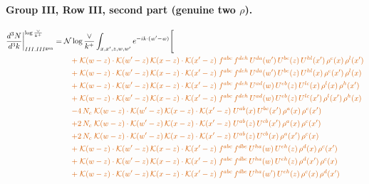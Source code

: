 \documentclass[10pt]{article}
\numberwithin{equation}{section}
\newcommand{\NNv}{\mathcal N\log\frac{\vee}{k^+}}
\begin{document}
\paragraph{Group III, Row III, second part (genuine two $\rho$).}
\begin{align}
\frac{d^3N}{d^3k}\bigg|^{\log\frac{\vee}{k^+}}_{III.III^{\rm gen}}={}&\NNv\int_{x,x',z,w,w'}e^{-ik\cdot(w'-w)}\Bigg[\notag\\
&\quad{\color{BFK}+\;\mathcal{K}(w-z)\cdot\mathcal{K}(w'-z)\,\mathcal{K}(x-z)\cdot\mathcal{K}(x'-z)\;f^{abc}\,f^{deh}\,U^{da}(w')\,U^{be}(z)\,U^{hl}(x')\,\rho^{c}(x)\,\rho^{l}(x')}\notag\\
&\quad{\color{BFK}+\;\mathcal{K}(w-z)\cdot\mathcal{K}(w'-z)\,\mathcal{K}(x-z)\cdot\mathcal{K}(x'-z)\;f^{abc}\,f^{deh}\,U^{da}(w')\,U^{be}(z)\,U^{hl}(x)\,\rho^{c}(x')\,\rho^{l}(x)}\notag\\
&\quad{\color{BFK}+\;\mathcal{K}(w-z)\cdot\mathcal{K}(w'-z)\,\mathcal{K}(x-z)\cdot\mathcal{K}(x'-z)\;f^{abc}\,f^{deh}\,U^{ad}(w)\,U^{eb}(z)\,U^{lc}(x)\,\rho^{l}(x)\,\rho^{h}(x')}\notag\\
&\quad{\color{BFK}+\;\mathcal{K}(w-z)\cdot\mathcal{K}(w'-z)\,\mathcal{K}(x-z)\cdot\mathcal{K}(x'-z)\;f^{abc}\,f^{deh}\,U^{ad}(w)\,U^{eb}(z)\,U^{lc}(x')\,\rho^{l}(x')\,\rho^{h}(x)}\notag\\
&\quad{\color{BFK}-4\,N_c\;\mathcal{K}(w-z)\cdot\mathcal{K}(w'-z)\,\mathcal{K}(x-z)\cdot\mathcal{K}(x'-z)\;U^{ab}(x)\,U^{bc}(x')\,\rho^{a}(x)\,\rho^{c}(x')}\notag\\
&\quad{\color{BFK}+2\,N_c\;\mathcal{K}(w-z)\cdot\mathcal{K}(w'-z)\,\mathcal{K}(x-z)\cdot\mathcal{K}(x'-z)\;U^{ab}(z)\,U^{cb}(x')\,\rho^{a}(x)\,\rho^{c}(x')}\notag\\
&\quad{\color{BFK}+2\,N_c\;\mathcal{K}(w-z)\cdot\mathcal{K}(w'-z)\,\mathcal{K}(x-z)\cdot\mathcal{K}(x'-z)\;U^{ab}(z)\,U^{cb}(x)\,\rho^{a}(x')\,\rho^{c}(x)}\notag\\
&\quad{\color{BFK}+\;\mathcal{K}(w-z)\cdot\mathcal{K}(w'-z)\,\mathcal{K}(x-z)\cdot\mathcal{K}(x'-z)\;f^{abc}\,f^{dbe}\,U^{ha}(w)\,U^{eh}(z)\,\rho^{d}(x)\,\rho^{c}(x')}\notag\\
&\quad{\color{BFK}+\;\mathcal{K}(w-z)\cdot\mathcal{K}(w'-z)\,\mathcal{K}(x-z)\cdot\mathcal{K}(x'-z)\;f^{abc}\,f^{dbe}\,U^{ha}(w)\,U^{eh}(z)\,\rho^{d}(x')\,\rho^{c}(x)}\notag\\
&\quad{\color{BFK}+\;\mathcal{K}(w-z)\cdot\mathcal{K}(w'-z)\,\mathcal{K}(x-z)\cdot\mathcal{K}(x'-z)\;f^{abc}\,f^{dbe}\,U^{ha}(w')\,U^{eh}(z)\,\rho^{c}(x)\,\rho^{d}(x')}\notag\\

\end{align}
\end{document}
